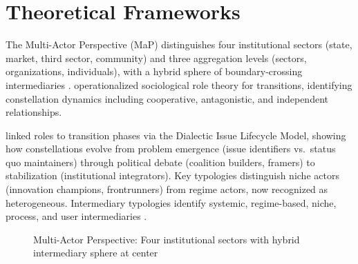 \documentclass[
    fontsize=10pt,
    twoside=true,
    secnumdepth=2,
    numbers=noenddot
]{kaobook}
\begin{document}
\section{Theoretical Frameworks}

The Multi-Actor Perspective (MaP) distinguishes four institutional sectors (state, market, third sector, community) and three aggregation levels (sectors, organizations, individuals), with a hybrid sphere of boundary-crossing intermediaries \citep{avelino2016shifting}. \citet{wittmayer2017actor} operationalized sociological role theory for transitions, identifying constellation dynamics including cooperative, antagonistic, and independent relationships.

\citet{bodenheimer2021lost} linked roles to transition phases via the Dialectic Issue Lifecycle Model, showing how constellations evolve from problem emergence (issue identifiers vs.\ status quo maintainers) through political debate (coalition builders, framers) to stabilization (institutional integrators). Key typologies distinguish niche actors (innovation champions, frontrunners) from regime actors, now recognized as heterogeneous. Intermediary typologies identify systemic, regime-based, niche, process, and user intermediaries \citep{kivimaa2019typology}.

\begin{figure}[htbp]
\centering
{}
\caption{Multi-Actor Perspective: Four institutional sectors with hybrid intermediary sphere at center}
\label{fig:map-sectors}
\end{figure}
\end{document}
